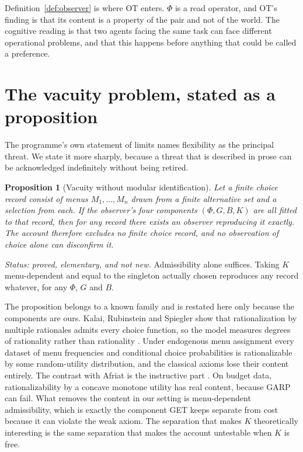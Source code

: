 \documentclass[11pt,letterpaper]{article}
\theoremstyle{plain}
\newtheorem{proposition}[theorem]{Proposition}
\theoremstyle{definition}
\begin{document}
Definition~\ref{def:observer} is where OT enters. $\Phi$ is a read operator, and
OT's finding is that its content is a property of the pair and not of the world.
The cognitive reading is that two agents facing the same task can face different
operational problems, and that this happens before anything that could be called
a preference.

\section{The vacuity problem, stated as a proposition}

The programme's own statement of limits names flexibility as the principal
threat. We state it more sharply, because a threat that is described in prose
can be acknowledged indefinitely without being retired.

\begin{proposition}[Vacuity without modular identification]
\label{prop:vacuity}
Let a finite choice record consist of menus $M_1,\dots,M_n$ drawn from a finite
alternative set and a selection from each. If the observer's four components
$(\Phi, G, B, K)$ are all fitted to that record, then for any record there
exists an observer reproducing it exactly. The account therefore excludes no
finite choice record, and no observation of choice alone can disconfirm it.
\end{proposition}

\noindent\emph{Status: proved, elementary, and not new.} Admissibility alone
suffices. Taking $K$ menu-dependent and equal to the singleton actually chosen
reproduces any record whatever, for any $\Phi$, $G$ and $B$.

The proposition belongs to a known family and is restated here only because the
components are ours. Kalai, Rubinstein and Spiegler show that rationalization by
multiple rationales admits every choice function, so the model measures degrees
of rationality rather than rationality \cite{krs2002}. Under endogenous menu
assignment every dataset of menu frequencies and conditional choice
probabilities is rationalizable by some random-utility distribution, and the
classical axioms lose their content entirely. The contrast with Afriat is the
instructive part \cite{afriat1967}. On budget data, rationalizability by a
concave monotone utility has real content, because GARP can fail. What removes
the content in our setting is menu-dependent admissibility, which is exactly the
component GET keeps separate from cost because it can violate the weak axiom.
The separation that makes $K$ theoretically interesting is the same separation
that makes the account untestable when $K$ is free.
\end{document}
